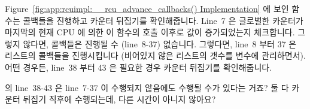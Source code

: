 Figure~\ref{fig:app:rcuimpl:__rcu_advance_callbacks() Implementation}
에 보인  함수는 콜백들을 진행하고 카운터 뒤집기를
확인해줍니다.
Line~7 은 글로벌한  카운터가 마지막의 현재 CPU 에
의한 이 함수의 호출 이후로 값이 증가되었는지 체크합니다.
그렇지 않다면, 콜백들은 진행될 수 (line~8-37) 없습니다.
그렇다면, line~8 부터 37 은 리스트의 콜백들을 진행시킵니다 (비어있지 않은
리스트의 갯수를  변수에 관리하면서).
어떤 경우든, line~38 부터 43 은 필요한 경우 카운터 뒤집기를 확인해줍니다.

\QuickQuiz{}
	 의 line~38-43 은 line~7-37 이 수행되지
	않음에도 수행될 수가 있다는 거죠?
	둘 다 카운터 뒤집기 직후에 수행되는데, 다른 시간이 아니지 않아요?
	\iffalse

